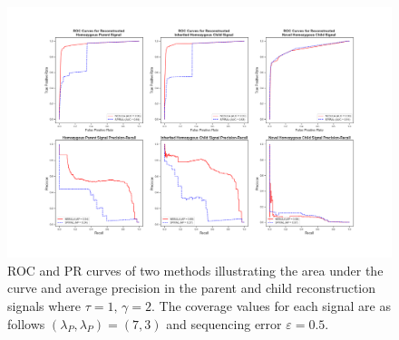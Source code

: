 \begin{figure}[t]
	
	\begin{minipage}[t]{1.0\linewidth}
		\centering
		\centerline{\includegraphics[width=\textwidth]{figs/results_100000n_5000k_7Lp_3Lc_diploid_4pctNovel_80pctSim_5e-01eps_1tau_2gamma_RESULTS}}
	\end{minipage}
	
	\caption{ROC and PR curves of two methods illustrating the area under the curve and average precision in the parent and child reconstruction signals where $\tau = 1, \, \gamma = 2$. The coverage values for each signal are as follows $(\lambda_P, \lambda_P) = (7,3)$ and sequencing error $\varepsilon = 0.5.$}
	\label{fig:results}
\end{figure}